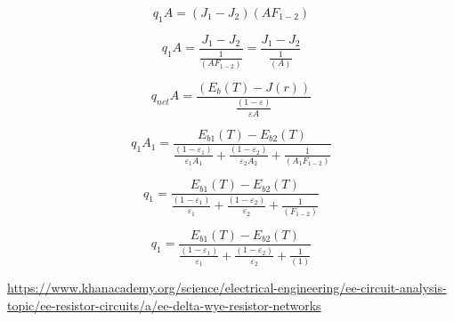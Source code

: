 \documentclass[12pt]{article}
\renewcommand{\_}{\kern-1.5pt\textunderscore\kern-1.5pt}
\begin{document}
 \[ q_{1}A= \left( J_{1}-J_{2} \right)  \left( AF_{1-2} \right)  \] \par

 \[ q_{1}A=\frac{J_{1}-J_{2}}{\frac{1}{ \left( AF_{1-2} \right) }}=\frac{J_{1}-J_{2}}{\frac{1}{ \left( A \right) }} \] \par

\par

 \[ q_{net}A=\frac{ \left( E_{b} \left( T \right) -J \left( r \right)  \right) }{\frac{ \left( 1- \varepsilon  \right) }{ \varepsilon A}} \] \par

\par

\par

 \[ q_{1}A_{1}=\frac{E_{b1} \left( T \right) -E_{b2} \left( T \right) }{\frac{ \left( 1- \varepsilon _{1} \right) }{ \varepsilon _{1}A_{1}}+\frac{ \left( 1- \varepsilon _{2} \right) }{ \varepsilon _{2}A_{2}}+\frac{1}{ \left( A_{1}F_{1-2} \right) }} \] \par

 \[ q_{1}=\frac{E_{b1} \left( T \right) -E_{b2} \left( T \right) }{\frac{ \left( 1- \varepsilon _{1} \right) }{ \varepsilon _{1}}+\frac{ \left( 1- \varepsilon _{2} \right) }{ \varepsilon _{2}}+\frac{1}{ \left( F_{1-2} \right) }} \] \par

 \[ q_{1}=\frac{E_{b1} \left( T \right) -E_{b2} \left( T \right) }{\frac{ \left( 1- \varepsilon _{1} \right) }{ \varepsilon _{1}}+\frac{ \left( 1- \varepsilon _{2} \right) }{ \varepsilon _{2}}+\frac{1}{ \left( 1 \right) }} \] \par

\par


\vspace{\baselineskip}

\vspace{\baselineskip}
\par

\par


\vspace{\baselineskip}
\href{https://www.khanacademy.org/science/electrical-engineering/ee-circuit-analysis-topic/ee-resistor-circuits/a/ee-delta-wye-resistor-networks}{https://www.khanacademy.org/science/electrical-engineering/ee-circuit-analysis-topic/ee-resistor-circuits/a/ee-delta-wye-resistor-networks}\par
\end{document}
